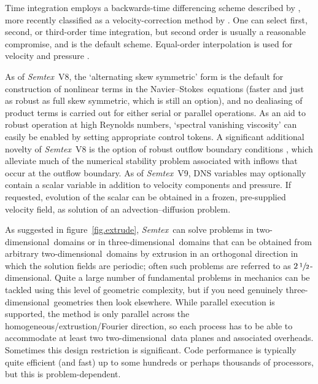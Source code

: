 \documentclass[11pt]{report}
\newcommand{\Semtex}{\emph{Semtex}} \newcommand{\Dog}{\emph{Dog}}
\newcommand\twod{two-di\-men\-sion\-al}
\newcommand\threed{three-di\-men\-sion\-al}
\newcommand\NavSto{Navier--Stokes}
\begin{document}
Time integration employs a backwards-time differencing scheme
described by \citet{kio91}, more recently classified as a
velocity-correction method by \citet{gush03}. One can select first,
second, or third-order time integration, but second order is usually a
reasonable compromise, and is the default scheme. Equal-order
interpolation is used for velocity and pressure
\citep[see][]{gms06}. 

As of \Semtex~V8, the `alternating skew symmetric' form \citep{zan91b}
is the default for construction of nonlinear terms in the
\NavSto\ equations (faster and just as robust as full skew symmetric,
which is still an option), and no dealiasing of product terms is
carried out for either serial or parallel operations.  As an aid to
robust operation at high Reynolds numbers, `spectral vanishing
viscosity' \citep{xupa04} can easily be enabled by setting appropriate
control tokens.
%
A significant additional novelty of \Semtex~V8 is the option of robust
outflow boundary conditions \citep{dkc14}, which alleviate much of the
numerical stability problem associated with inflows that occur at the
outflow boundary.
%
As of \Semtex~V9, DNS variables may optionally contain a scalar
variable in addition to velocity components and pressure.  If
requested, evolution of the scalar can be obtained in a frozen,
pre-supplied velocity field, \ie as solution of an advection--diffusion
problem.

As suggested in figure~\ref{fig.extrude}, \Semtex\ can solve problems
in \twod\ domains or in \threed\ domains that can be obtained from
arbitrary \twod\ domains by extrusion in an orthogonal direction in
which the solution fields are periodic; often such problems are
referred to as $2\,\sfrac{1}{2}$-dimensional.  Quite a large number of
fundamental problems in mechanics can be tackled using this level of
geometric complexity, but if you need genuinely \threed\ geometries
then look elsewhere.  While parallel execution is supported, the
method is only parallel across the homogeneous/extrustion/Fourier
direction, so each process has to be able to accommodate at least two
\twod\ data planes and associated overheads.  Sometimes this design
restriction is significant.  Code performance is typically quite
efficient (and fast) up to some hundreds or perhaps thousands of
processors, but this is problem-dependent.
\end{document}
